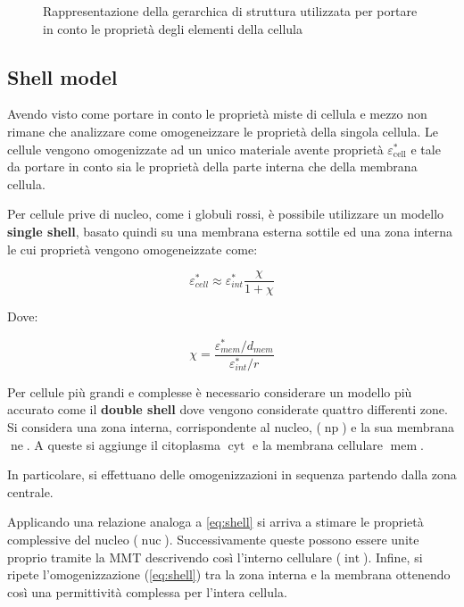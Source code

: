 \begin{figure}[b!]
	\centering
	\footnotesize{\def\svgwidth{0.95\linewidth}
	}
	\caption{Rappresentazione della gerarchica di struttura utilizzata per portare in conto le proprietà degli elementi della cellula}
	\label{fig:structure}
\end{figure}


\subsection{Shell model}

Avendo visto come portare in conto le proprietà miste di cellula e mezzo non rimane che analizzare come omogeneizzare le proprietà della singola cellula. 
Le cellule vengono omogenizzate ad un unico materiale avente proprietà $\varepsilon^*_{\operatorname{cell}}$ e tale da portare in conto sia le proprietà della parte interna che della membrana cellula.

Per cellule prive di nucleo, come i globuli rossi, è possibile utilizzare un modello \textbf{single shell}, basato quindi su una membrana esterna sottile ed una zona interna le cui proprietà vengono omogeneizzate come:

\begin{equation}
	\varepsilon_{c e l l}^{*} \approx \varepsilon_{i n t}^{*} \frac{\chi}{1+\chi}
	\label{eq:shell}
\end{equation}

Dove:

\begin{equation}
	\chi=\frac{\varepsilon_{m e m}^{*} / d_{m e m}}{\varepsilon_{i n t}^{*} / r}
\end{equation}

Per cellule più grandi e complesse è necessario considerare un modello più accurato come il \textbf{double shell} dove vengono considerate quattro differenti zone. Si considera una zona interna, corrispondente al nucleo, ($\operatorname{np}$) e la sua membrana $\operatorname{ne}$. A queste si aggiunge il citoplasma $\operatorname{cyt}$ e la membrana cellulare $\operatorname{mem}$. 

In particolare, si effettuano delle omogenizzazioni in sequenza partendo dalla zona centrale. 

Applicando una relazione analoga a \cref{eq:shell} si arriva a stimare le proprietà complessive del nucleo ($\operatorname{nuc}$). Successivamente queste possono essere unite proprio tramite la MMT descrivendo così l'interno cellulare ($\operatorname{int}$). Infine, si ripete l'omogenizzazione (\cref{eq:shell}) tra la zona interna e la membrana ottenendo così una permittività complessa per l'intera cellula. 


